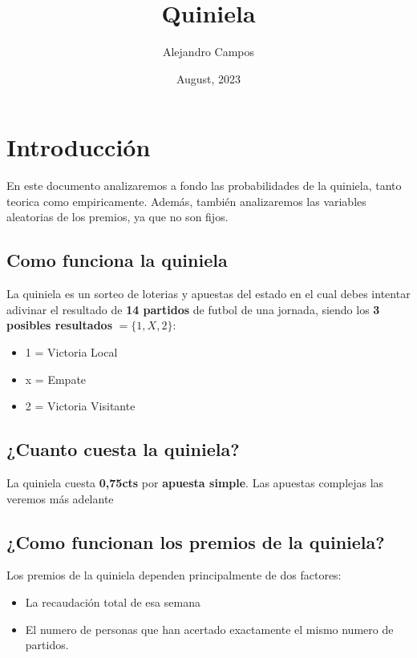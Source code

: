 \documentclass{article}
\title{\textbf{Quiniela}}
\author{Alejandro Campos}
\date{August, 2023}
\begin{document}
\maketitle
\newpage
\tableofcontents

\newpage

\section{Introducción}
En este documento analizaremos a fondo las probabilidades de la quiniela, tanto teorica como empiricamente. Además, también analizaremos las variables aleatorias de los premios, ya que no son fijos.

\subsection{Como funciona la quiniela}

La quiniela es un sorteo de loterias y apuestas del estado en el cual debes intentar adivinar el resultado de \textbf{14 partidos} de futbol de una jornada, siendo los \textbf{3 posibles resultados} $=\{1,X,2\}$:
\begin{itemize}
    \item 1 = Victoria Local
    \item x = Empate
    \item 2 = Victoria Visitante
\end{itemize}

\subsection{¿Cuanto cuesta la quiniela?}
La quiniela cuesta \textbf{0,75cts} por \textbf{apuesta simple}. Las apuestas complejas las veremos más adelante

\subsection{¿Como funcionan los premios de la quiniela?}
Los premios de la quiniela dependen principalmente de dos factores:
\begin{itemize}
    \item La recaudación total de esa semana
    \item El numero de personas que han acertado exactamente el mismo numero de partidos.
\end{itemize}
\end{document}
